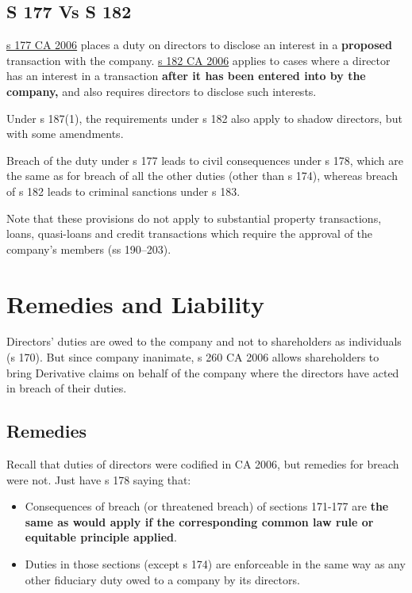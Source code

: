 \documentclass[
]{article}
\providecommand{\tightlist}{%
  \setlength{\itemsep}{0pt}\setlength{\parskip}{0pt}}
\begin{document}
\hypertarget{s-177-vs-s-182}{%
\subsection{S 177 Vs S 182}\label{s-177-vs-s-182}}

\href{https://www.legislation.gov.uk/ukpga/2006/46/section/177}{s 177 CA
2006} places a duty on directors to disclose an interest in a
\textbf{proposed} transaction with the company.
\href{https://www.legislation.gov.uk/ukpga/2006/46/section/182}{s 182 CA
2006} applies to cases where a director has an interest in a transaction
\textbf{after it has been entered into by the company,} and also
requires directors to disclose such interests.

Under s 187(1), the requirements under s 182 also apply to shadow
directors, but with some amendments.

Breach of the duty under s 177 leads to civil consequences under s 178,
which are the same as for breach of all the other duties (other than s
174), whereas breach of s 182 leads to criminal sanctions under s 183.

Note that these provisions do not apply to substantial property
transactions, loans, quasi-loans and credit transactions which require
the approval of the company's members (ss 190--203).

\hypertarget{remedies-and-liability}{%
\section{Remedies and Liability}\label{remedies-and-liability}}

Directors' duties are owed to the company and not to shareholders as
individuals (s 170). But since company inanimate, s 260 CA 2006 allows
shareholders to bring Derivative claims on behalf of the company where
the directors have acted in breach of their duties.

\hypertarget{remedies}{%
\subsection{Remedies}\label{remedies}}

Recall that duties of directors were codified in CA 2006, but remedies
for breach were not. Just have s 178 saying that:

\begin{itemize}
\tightlist
\item
  Consequences of breach (or threatened breach) of sections 171-177 are
  \textbf{the same as would apply if the corresponding common law rule
  or equitable principle applied}.
\item
  Duties in those sections (except s 174) are enforceable in the same
  way as any other fiduciary duty owed to a company by its directors.
\end{itemize}
\end{document}
